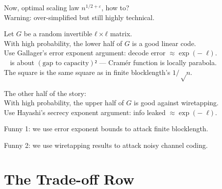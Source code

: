 \documentclass[12pt, aspectratio=1610]{beamer}
\DeclareMathOperator\Er{E_\mathrm r}
\begin{document}

\begin{frame}
	Now, optimal scaling law $n^{1/2+ε}$, how to? \\
	Warning: over-simplified but still highly technical.

	\pause

	Let $G$ be a random invertible $ℓ × ℓ$ matrix. \\
	With high probability, the lower half of $G$ is a good linear code. \\
	Use Gallager's error exponent argument: decode error $≈ \exp(-\Er ℓ)$. \\
	$\Er$ is about $(\text{gap to capacity})²$ ---
	Cramér function is locally parabola. \\
	The square is the same square as in finite blocklength's $1/√n$.

	\pause

	The other half of the story: \\
	With high probability,
	the upper half of $G$ is good against wiretapping. \\
	Use Hayashi's secrecy exponent argument: info leaked $≈ \exp(-\Er ℓ)$.

	\pause

	\only<+->
	{Funny 1: we use error exponent bounds to attack finite blocklength.}
	
	\only<+->
	{Funny 2: we use wiretapping results to attack noisy channel coding.}
\end{frame}

\part{The Trade-off Row}

\end{document}
